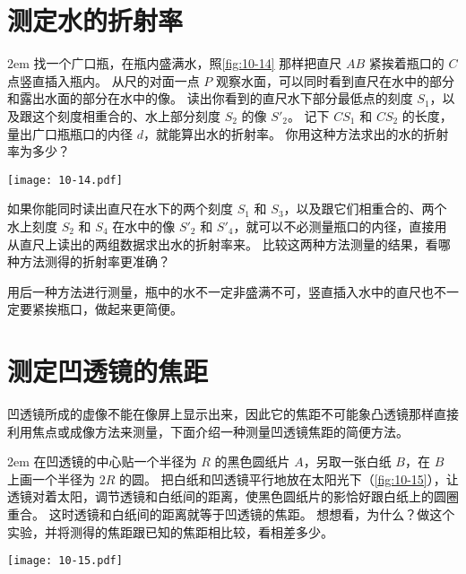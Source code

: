 \section{测定水的折射率}
\medskip\noindent
\begin{minipage}{0.55\linewidth}\parindent2em
找一个广口瓶，在瓶内盛满水，照\cref{fig:10-14} 那样把直尺 $AB$ 紧挨着瓶口的 $C$ 点竖直插入瓶内。
从尺的对面一点 $P$ 观察水面，可以同时看到直尺在水中的部分和露出水面的部分在水中的像。
读出你看到的直尺水下部分最低点的刻度 $S_1$，以及跟这个刻度相重合的、水上部分刻度 $S_2$ 的像 $S'_2$。
记下 $CS_1$ 和 $CS_2$ 的长度，量出广口瓶瓶口的内径 $d$，就能算出水的折射率。
你用这种方法求出的水的折射率为多少？
\end{minipage}\hfill
\begin{minipage}{0.4\linewidth}\centering
  \begin{figurehere}
    \texttt{[image: 10-14.pdf]}
    \caption{}\label{fig:10-14}
  \end{figurehere}
\end{minipage}

\medskip
如果你能同时读出直尺在水下的两个刻度 $S_1$ 和 $S_3$，以及跟它们相重合的、两个水上刻度 $S_2$ 和 $S_4$ 在水中的像 $S'_2$ 和 $S'_4$，就可以不必测量瓶口的内径，直接用从直尺上读出的两组数据求出水的折射率来。
比较这两种方法测量的结果，看哪种方法测得的折射率更准确？

用后一种方法进行测量，瓶中的水不一定非盛满不可，竖直插入水中的直尺也不一定要紧挨瓶口，做起来更简便。

\section{测定凹透镜的焦距}
凹透镜所成的虚像不能在像屏上显示出来，因此它的焦距不可能象凸透镜那样直接利用焦点或成像方法来测量，下面介绍一种测量凹透镜焦距的简便方法。

\medskip\noindent
\begin{minipage}{0.55\linewidth}\parindent2em
在凹透镜的中心贴一个半径为 $R$ 的黑色圆纸片 $A$，另取一张白纸 $B$，在 $B$ 上画一个半径为 $2R$ 的圆。
把白纸和凹透镜平行地放在太阳光下（\cref{fig:10-15}），让透镜对着太阳，调节透镜和白纸间的距离，使黑色圆纸片的影恰好跟白纸上的圆圈重合。
这时透镜和白纸间的距离就等于凹透镜的焦距。
想想看，为什么？做这个实验，并将测得的焦距跟已知的焦距相比较，看相差多少。
\end{minipage}\hfill
\begin{minipage}{0.4\linewidth}\centering
  \begin{figurehere}
    \texttt{[image: 10-15.pdf]}
    \caption{}\label{fig:10-15}
  \end{figurehere}
\end{minipage}